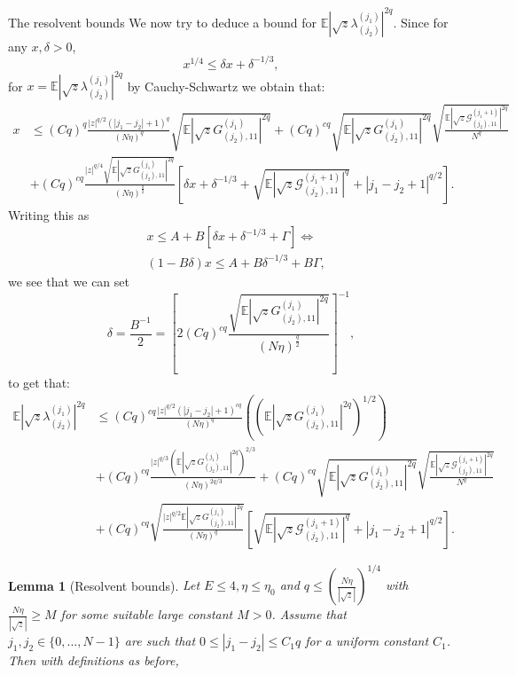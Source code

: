 \documentclass[11pt, a4paper, oneside]{book}
\numberwithin{equation}{chapter}
\newcommand{\E}{\mathbb E}
\newtheorem{lem}[thm]{Lemma}
\begin{document}
\begin{section}{The resolvent bounds}
We now try to deduce a bound for $\E |\sqrt{z}\lambda_{(j_2)}^{(j_1)}|^{2q}$. Since for any $x, \delta>0$, 
%
$$x^{1/4} \leq \delta x + \delta^{-1/3},$$
%
for $x = \E|\sqrt{z} \lambda_{(j_2)}^{(j_1)}|^{2q} $ by Cauchy-Schwartz we obtain that:
\begin{align*}
     x &\leq (Cq)^q \frac{ |z|^{q/2} \left ( |j_1- j_2|+1 \right )^q  }{(N\eta)^q} \sqrt{ \E |\sqrt{z} G^{(j_1)}_{(j_2),11}|^{2q} } + \left(C q\right)^{cq} \sqrt{ \E|\sqrt{z} G^{(j_1)}_{(j_2),11}|^{2q} } \sqrt{ \frac{\E|\sqrt{z} \mathcal{G}^{(j_1+1)}_{(j_2),11}|^{2q}}{N^q}} \\
     &+
     (Cq)^{cq} \frac{ |z|^{q/4} \sqrt{ \E|\sqrt{z} G^{(j_1)}_{(j_2),11}|^{2q}}} {(N\eta)^{\frac{q}{2}}} \left[ \delta x + \delta^{-1/3} + \sqrt{\E| \sqrt{z} \mathcal{G}^{(j_1+1)}_{(j_2),11}|^{q}} + |j_1-j_2+1|^{q/2} \right] .
\end{align*}
%
Writing this as
\begin{align*}
    &x \leq A + B \left [ \delta x + \delta^{-1/3} + \Gamma \right ] \Leftrightarrow \\
    &(1 - B \delta ) x \leq A + B \delta^{-1/3} + B \Gamma,
\end{align*}
%
we see that we can set 
%
$$ \delta = \frac{B^{-1}}{2} = \left [ 2(Cq)^{cq} \frac{ \sqrt{ \E|\sqrt{z} G^{(j_1)}_{(j_2),11}|^{2q}}} {(N\eta)^{\frac{q}{2}}} \right ]^{-1} ,$$
%
to get that:
%
\begin{align}\label{e:bb}
\E |\sqrt{z}\lambda_{(j_2)}^{(j_1)}|^{2q} 
&\leq (Cq)^{cq} \frac{|z|^{q/2}(|j_1-j_2|+1)^{cq}}{(N\eta)^{q}} \left((\E|\sqrt{z} {G}^{(j_1)}_{(j_2),11}|^{2q})^{1/2} \right) \nonumber \\ 
&+ (Cq)^{cq} \frac{|z|^{q/3} \left( \E|\sqrt{z} {G}^{(j_1)}_{(j_2),11}|^{2q} \right )^{2/3}}{(N\eta)^{2q/3}} + \left (C q\right)^{cq} \sqrt{ \E|\sqrt{z} G^{(j_1)}_{(j_2),11}|^{2q} } \sqrt{ \frac{\E|\sqrt{z} \mathcal{G}^{(j_1+1)}_{(j_2),11}|^{2q}}{N^q}} \nonumber \\
&+\left(C q \right )^{cq} \sqrt{ \frac{ |z|^{q/2} \E|\sqrt{z}G^{(j_1)}_{(j_2),11}|^{2q}}{ (N\eta)^q}} \left [ \sqrt{\E|\sqrt{z}\mathcal{G}^{(j_1+1)}_{(j_2),11}|^{q}} + |j_1-j_2+1|^{q/2} \right ] .
\end{align}
%
%
\begin{lem}[Resolvent bounds] \label{l:Gkk}
Let $E \leq 4, \eta \leq \eta_0$ and $q \leq \left (\frac{N \eta}{|\sqrt{z}|} \right )^{1/4}$ with $\frac{N\eta}{|\sqrt{z}|} \geq M$ for some suitable large constant $M>0$. Assume that $j_1, j_2\in \{0,...,N-1\}$ are such that $0 \leq | j_1 - j_2| \leq  C_1 q$ for a uniform constant $C_1$. Then with definitions as before, 

\end{lem}
\end{section}
\end{document}
